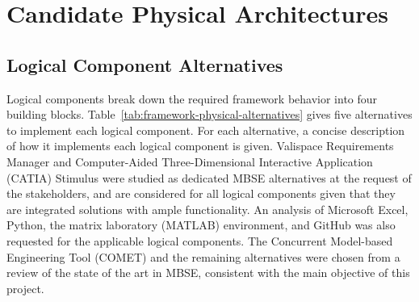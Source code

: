 \section{Candidate Physical Architectures}
\label{section:synthesize-physical-architectures}

\subsection{Logical Component Alternatives}
Logical components break down the required framework behavior into four building blocks.
Table~\ref{tab:framework-physical-alternatives} gives five alternatives to implement each logical component. For each alternative, a concise description of how it implements each logical component is given.
Valispace Requirements Manager and Computer-Aided Three-Dimensional Interactive Application (CATIA) Stimulus were studied as dedicated MBSE alternatives at the request of the stakeholders, and are considered for all logical components given that they are integrated solutions with ample functionality.
An analysis of Microsoft Excel, Python, the matrix laboratory (MATLAB) environment, and GitHub was also requested for the applicable logical components.
The Concurrent Model-based Engineering Tool (COMET) and the remaining alternatives were chosen from a review of the state of the art in MBSE, consistent with the main objective of this project.

